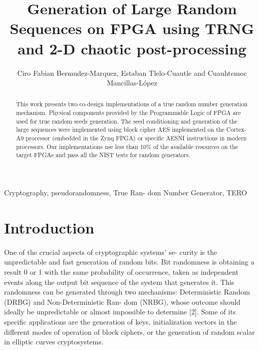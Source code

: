 \documentclass[journal]{IEEEtran}
\begin{document}
\title{Generation of Large Random Sequences on FPGA using TRNG and 2-D chaotic post-processing}

\author{Ciro Fabian Bermudez-Marquez, Estaban Tlelo-Cuautle and Cuauhtemoc Mancillas-López\\
}



\maketitle

\begin{abstract}
This work presents two co-design implementations of a true random number generation mechanism. Physical components provided by the Programmable Logic of FPGA are used for true random seeds generation. The seed conditioning and generation of the large sequences were implemented using block cipher AES implemented on the Cortex-A9 processor (embedded in the Zynq FPGA) or specific AESNI instructions in modern processors. Our implementations use less than 10\% of the available resources on the target FPGAs and pass all the NIST tests for random generators.
\end{abstract}

\begin{IEEEkeywords}
Cryptography, pseudorandomness, True Ran- dom Number Generator, TERO
\end{IEEEkeywords}

\section{Introduction}
One of the crucial aspects of cryptographic systems’ se- curity is the unpredictable and fast generation of random bits. Bit randomness is obtaining a result 0 or 1 with the same probability of occurrence, taken as independent events along the output bit sequence of the system that generates it. This randomness can be generated through two mechanisms: Deterministic Random (DRBG) and Non-Deterministic Ran- dom (NRBG), whose outcome should ideally be unpredictable or almost impossible to determine [2]. Some of its specific applications are the generation of keys, initialization vectors in the different modes of operation of block ciphers, or the generation of random scalar in elliptic curves cryptosystems. 
\end{document}
